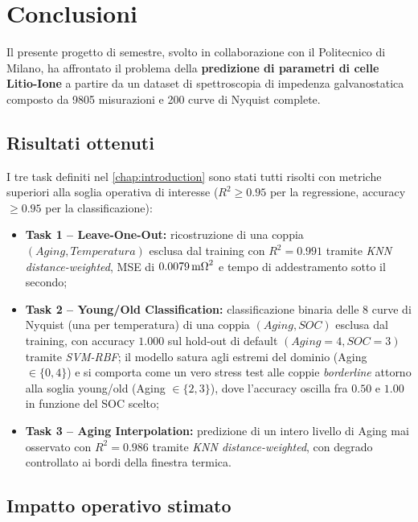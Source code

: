 \chapter{Conclusioni}
\label{chap:final-conclusions}

Il presente progetto di semestre, svolto in collaborazione con il
Politecnico di Milano, ha affrontato il problema della
\textbf{predizione di parametri di celle Litio-Ione} a partire da un
dataset di spettroscopia di impedenza galvanostatica composto da
\num{9805} misurazioni e 200 curve di Nyquist complete.

\section*{Risultati ottenuti}

I tre task definiti nel \cref{chap:introduction} sono stati tutti
risolti con metriche superiori alla soglia operativa di interesse
($R^{2} \geq 0.95$ per la regressione, accuracy $\geq 0.95$ per la
classificazione):
\begin{itemize}
  \item \textbf{Task 1 -- Leave-One-Out:} ricostruzione di una coppia
        $(Aging, Temperatura)$ esclusa dal training con
        $R^{2} = 0.991$ tramite \emph{KNN distance-weighted}, MSE di
        $0.0079\,\si{\milli\ohm}^2$ e tempo di addestramento sotto il
        secondo;
  \item \textbf{Task 2 -- Young/Old Classification:} classificazione
        binaria delle 8 curve di Nyquist (una per temperatura) di una
        coppia $(Aging, SOC)$ esclusa dal training, con accuracy
        $1.000$ sul hold-out di default $(Aging = 4, SOC = 3)$ tramite
        \emph{SVM-RBF}; il modello satura agli estremi del dominio
        (Aging $\in \{0, 4\}$) e si comporta come un vero stress test
        alle coppie \emph{borderline} attorno alla soglia young/old
        (Aging $\in \{2, 3\}$), dove l'accuracy oscilla fra $0.50$
        e $1.00$ in funzione del SOC scelto;
  \item \textbf{Task 3 -- Aging Interpolation:} predizione di un
        intero livello di Aging mai osservato con $R^{2} = 0.986$
        tramite \emph{KNN distance-weighted}, con degrado controllato
        ai bordi della finestra termica.
\end{itemize}

\section*{Impatto operativo stimato}

